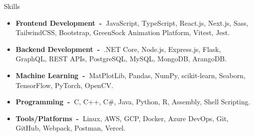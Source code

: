 \documentclass{resume}
\begin{document}
\begin{rSection}{Skills}
      \begin{itemize}[label=\null, leftmargin=*, parsep=0.5em]
            \item {
                  \textbf{Frontend Development~-~}JavaScript, TypeScript, React.js, Next.js, Sass, TailwindCSS, Bootstrap, GreenSock
                  Animation Platform, Vitest, Jest.
                  }
            \item {
                  \textbf{Backend Development~-~}.NET Core, Node.js, Express.js, Flask, GraphQL, REST APIs, PostgreSQL, MySQL,
                  MongoDB, ArangoDB.\@
                  }
            \item {
                  \textbf{Machine Learning~-~}MatPlotLib, Pandas, NumPy, scikit-learn, Seaborn, TensorFlow, PyTorch, OpenCV.\@
                  }
            \item {
                  \textbf{Programming~-~}C, C++, C\#, Java, Python, R, Assembly, Shell Scripting.
                  }
            \item {
                  \textbf{Tools/Platforms~-~}Linux, AWS, GCP, Docker, Azure DevOps, Git, GitHub, Webpack, Postman, Vercel.
                  }
      \end{itemize}
\end{rSection}

\end{document}

